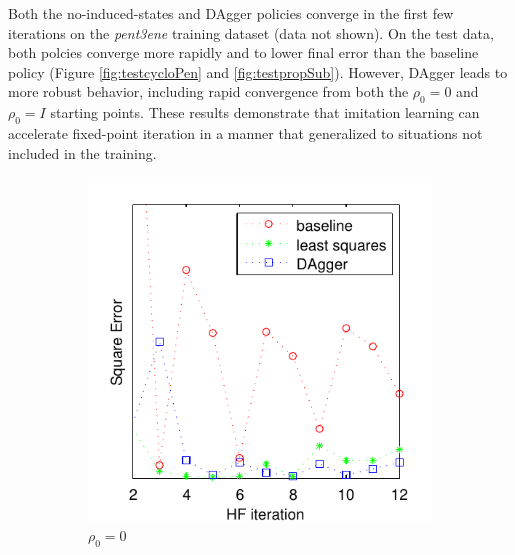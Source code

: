 \documentclass[twoside,11pt]{article}
\begin{document}
Both the no-induced-states and DAgger policies converge in the first few iterations on the \textit{pent3ene} training dataset (data not shown). On the test data, both polcies converge more rapidly and to lower final error than the baseline policy (Figure \ref{fig:testcycloPen} and \ref{fig:testpropSub}). However, DAgger leads to more robust behavior, including rapid convergence from both the  $\rho_0 = 0$ and $\rho_0 = I$ starting points. These results demonstrate that imitation learning can accelerate fixed-point iteration in a manner that generalized to situations not included in the training.

\begin{figure}[h!]
\centering
\begin{subfigure}{.5\textwidth}
  \centering
  \includegraphics[scale=0.7]{propylsub_pzero_test_12iter.pdf}
  \caption{$\rho_0 = 0$}
  \label{fig:propSub0}
\end{subfigure}%
\begin{subfigure}{.5\textwidth}
  \centering

\end{subfigure}
\end{figure}
\end{document}
